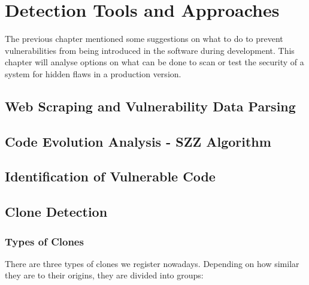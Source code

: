 
\newpage


\chapter{Detection Tools and Approaches}
\label{chapter:detection-tools}
  The previous chapter mentioned some suggestions on what to do to prevent vulnerabilities from being
  introduced in the software during development. This chapter will analyse options on what can be done
  to scan or test the security of a system for hidden flaws in a production version.

  \section{Web Scraping and Vulnerability Data Parsing}

  \section{Code Evolution Analysis - SZZ Algorithm}

  \section{Identification of Vulnerable Code}

  \section{Clone Detection}
    \subsection*{Types of Clones}
      There are three types of clones we register nowadays. Depending on  how similar they are to their
      origins, they are divided into groups:
